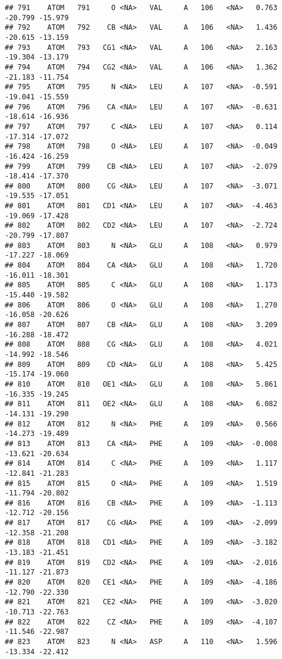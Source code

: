 \documentclass[
]{article}
\begin{document}
\begin{verbatim}
## 791    ATOM   791     O <NA>   VAL     A   106   <NA>   0.763 -20.799 -15.979
## 792    ATOM   792    CB <NA>   VAL     A   106   <NA>   1.436 -20.615 -13.159
## 793    ATOM   793   CG1 <NA>   VAL     A   106   <NA>   2.163 -19.304 -13.179
## 794    ATOM   794   CG2 <NA>   VAL     A   106   <NA>   1.362 -21.183 -11.754
## 795    ATOM   795     N <NA>   LEU     A   107   <NA>  -0.591 -19.041 -15.559
## 796    ATOM   796    CA <NA>   LEU     A   107   <NA>  -0.631 -18.614 -16.936
## 797    ATOM   797     C <NA>   LEU     A   107   <NA>   0.114 -17.314 -17.072
## 798    ATOM   798     O <NA>   LEU     A   107   <NA>  -0.049 -16.424 -16.259
## 799    ATOM   799    CB <NA>   LEU     A   107   <NA>  -2.079 -18.414 -17.370
## 800    ATOM   800    CG <NA>   LEU     A   107   <NA>  -3.071 -19.535 -17.051
## 801    ATOM   801   CD1 <NA>   LEU     A   107   <NA>  -4.463 -19.069 -17.428
## 802    ATOM   802   CD2 <NA>   LEU     A   107   <NA>  -2.724 -20.799 -17.807
## 803    ATOM   803     N <NA>   GLU     A   108   <NA>   0.979 -17.227 -18.069
## 804    ATOM   804    CA <NA>   GLU     A   108   <NA>   1.720 -16.011 -18.301
## 805    ATOM   805     C <NA>   GLU     A   108   <NA>   1.173 -15.440 -19.582
## 806    ATOM   806     O <NA>   GLU     A   108   <NA>   1.270 -16.058 -20.626
## 807    ATOM   807    CB <NA>   GLU     A   108   <NA>   3.209 -16.288 -18.472
## 808    ATOM   808    CG <NA>   GLU     A   108   <NA>   4.021 -14.992 -18.546
## 809    ATOM   809    CD <NA>   GLU     A   108   <NA>   5.425 -15.174 -19.060
## 810    ATOM   810   OE1 <NA>   GLU     A   108   <NA>   5.861 -16.335 -19.245
## 811    ATOM   811   OE2 <NA>   GLU     A   108   <NA>   6.082 -14.131 -19.290
## 812    ATOM   812     N <NA>   PHE     A   109   <NA>   0.566 -14.273 -19.489
## 813    ATOM   813    CA <NA>   PHE     A   109   <NA>  -0.008 -13.621 -20.634
## 814    ATOM   814     C <NA>   PHE     A   109   <NA>   1.117 -12.841 -21.283
## 815    ATOM   815     O <NA>   PHE     A   109   <NA>   1.519 -11.794 -20.802
## 816    ATOM   816    CB <NA>   PHE     A   109   <NA>  -1.113 -12.712 -20.156
## 817    ATOM   817    CG <NA>   PHE     A   109   <NA>  -2.099 -12.358 -21.208
## 818    ATOM   818   CD1 <NA>   PHE     A   109   <NA>  -3.182 -13.183 -21.451
## 819    ATOM   819   CD2 <NA>   PHE     A   109   <NA>  -2.016 -11.127 -21.873
## 820    ATOM   820   CE1 <NA>   PHE     A   109   <NA>  -4.186 -12.790 -22.330
## 821    ATOM   821   CE2 <NA>   PHE     A   109   <NA>  -3.020 -10.713 -22.763
## 822    ATOM   822    CZ <NA>   PHE     A   109   <NA>  -4.107 -11.546 -22.987
## 823    ATOM   823     N <NA>   ASP     A   110   <NA>   1.596 -13.334 -22.412

\end{verbatim}
\end{document}
